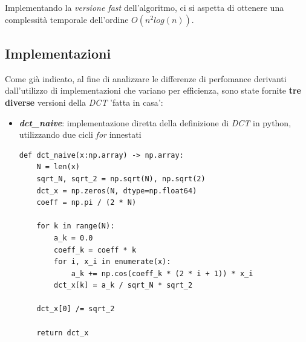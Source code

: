     Implementando la \textit{versione fast} dell'algoritmo, ci si aspetta di ottenere una complessità temporale dell'ordine $O(n^2 log(n))$.
    
\subsection{Implementazioni} \label{subsec:implementations}
    Come già indicato, al fine di analizzare le differenze di perfomance derivanti dall'utilizzo di implementazioni che variano per efficienza, sono state fornite \textbf{tre diverse} versioni della \textit{DCT} 'fatta in casa':
    \begin{itemize}
        \item \textit{\textbf{dct\_naive}}: implementazione diretta della definizione di \textit{DCT} in python, utilizzando due cicli \textit{for} innestati 
        
        \begin{lstlisting}
def dct_naive(x:np.array) -> np.array:
    N = len(x)
    sqrt_N, sqrt_2 = np.sqrt(N), np.sqrt(2)
    dct_x = np.zeros(N, dtype=np.float64)
    coeff = np.pi / (2 * N)

    for k in range(N):
        a_k = 0.0
        coeff_k = coeff * k
        for i, x_i in enumerate(x):
            a_k += np.cos(coeff_k * (2 * i + 1)) * x_i
        dct_x[k] = a_k / sqrt_N * sqrt_2

    dct_x[0] /= sqrt_2

    return dct_x
        \end{lstlisting}
        

\end{itemize}
